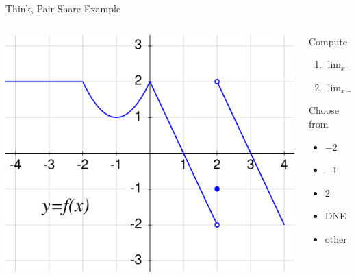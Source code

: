 \documentclass[10pt, aspectratio=169, t]{beamer}
\begin{document}
\begin{frame}{Think, Pair Share Example}
	\begin{columns}
	\begin{column}{0.7\textwidth}

		\includegraphics[width=.9\textwidth]{think-pair-share-graph.pdf}

	\end{column}
	\begin{column}{0.3\textwidth}  %
		\begin{block}{Compute}
			\begin{enumerate}
				\item {\Large $\displaystyle \lim_{x\to 2} f(x)$}
				\item {\Large $\displaystyle \lim_{x\to 0} f(f(x))$}
			\end{enumerate}
		\end{block}
		\pause
		\begin{block}{Choose from}
			\begin{itemize}
				\item[] $-2$
				\item[] $-1$
				\item[] $2$
				\item[] DNE
				\item[] other
			\end{itemize}
		\end{block}
	\end{column}
	\end{columns}
\end{frame}
\end{document}
